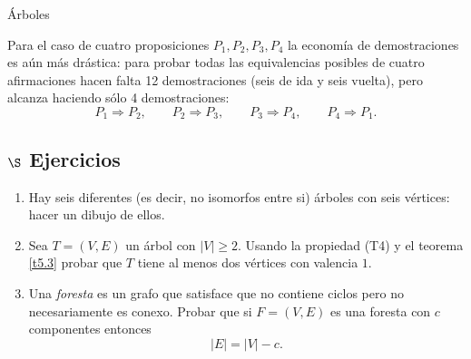 \begin{section}{Árboles}
\begin{observacion}
Para el caso de cuatro proposiciones $P_1,P_2,P_3,P_4$ la economía de demostraciones es aún más drástica: para probar todas las equivalencias posibles de cuatro afirmaciones hacen falta 12 demostraciones (seis de ida y seis vuelta), pero alcanza haciendo sólo 4 demostraciones:
$$
P_1 \Rightarrow P_2,\qquad P_2 \Rightarrow P_3,\qquad P_3 \Rightarrow P_4,\qquad P_4 \Rightarrow P_1. 
$$ 
\end{observacion}


\subsection*{\Large $\S$ Ejercicios}\label{ejercicios5.5}
\begin{enumerate}[1)]
\item \label{ejercicio5.5.1} Hay seis diferentes (es decir, no isomorfos entre si) árboles con
seis vértices: hacer un dibujo de ellos.
\item Sea $T=(V,E)$ un árbol con $|V| \ge 2$. Usando la propiedad (T4) y el teorema
\ref{t5.3}
probar que $T$ tiene al menos dos vértices con valencia $1$.
\item Una {\em foresta} es un grafo que satisface que no contiene ciclos pero no
necesariamente es conexo. Probar que si $F=(V,E)$ es una foresta con
$c$ componentes entonces
$$
|E|=|V|-c.
$$
\end{enumerate}

\end{section}




